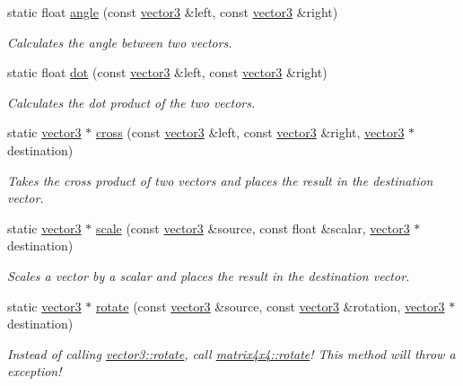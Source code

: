 \begin{DoxyCompactItemize}
static float \hyperlink{classflounder_1_1vector3_a770e2b88cb668db8e2345ece7fd0b55f}{angle} (const \hyperlink{classflounder_1_1vector3}{vector3} \&left, const \hyperlink{classflounder_1_1vector3}{vector3} \&right)
\begin{DoxyCompactList}\small\item\em Calculates the angle between two vectors. \end{DoxyCompactList}\item 
static float \hyperlink{classflounder_1_1vector3_a238394c8800f15754c80a536e4ed2a2a}{dot} (const \hyperlink{classflounder_1_1vector3}{vector3} \&left, const \hyperlink{classflounder_1_1vector3}{vector3} \&right)
\begin{DoxyCompactList}\small\item\em Calculates the dot product of the two vectors. \end{DoxyCompactList}\item 
static \hyperlink{classflounder_1_1vector3}{vector3} $\ast$ \hyperlink{classflounder_1_1vector3_a403643bba81d2b27256223c4437cdca1}{cross} (const \hyperlink{classflounder_1_1vector3}{vector3} \&left, const \hyperlink{classflounder_1_1vector3}{vector3} \&right, \hyperlink{classflounder_1_1vector3}{vector3} $\ast$destination)
\begin{DoxyCompactList}\small\item\em Takes the cross product of two vectors and places the result in the destination vector. \end{DoxyCompactList}\item 
static \hyperlink{classflounder_1_1vector3}{vector3} $\ast$ \hyperlink{classflounder_1_1vector3_a0239e6c1f38120a846cdab87f639cfff}{scale} (const \hyperlink{classflounder_1_1vector3}{vector3} \&source, const float \&scalar, \hyperlink{classflounder_1_1vector3}{vector3} $\ast$destination)
\begin{DoxyCompactList}\small\item\em Scales a vector by a scalar and places the result in the destination vector. \end{DoxyCompactList}\item 
static \hyperlink{classflounder_1_1vector3}{vector3} $\ast$ \hyperlink{classflounder_1_1vector3_a72f477f912b5c3967eb6aa9e531f54d8}{rotate} (const \hyperlink{classflounder_1_1vector3}{vector3} \&source, const \hyperlink{classflounder_1_1vector3}{vector3} \&rotation, \hyperlink{classflounder_1_1vector3}{vector3} $\ast$destination)
\begin{DoxyCompactList}\small\item\em Instead of calling \hyperlink{classflounder_1_1vector3_a72f477f912b5c3967eb6aa9e531f54d8}{vector3\+::rotate}, call \hyperlink{classflounder_1_1matrix4x4_a609091aacfd80ea7ad75dd1c4d14b837}{matrix4x4\+::rotate}! This method will throw a exception! \end{DoxyCompactList}\item 

\end{DoxyCompactItemize}
